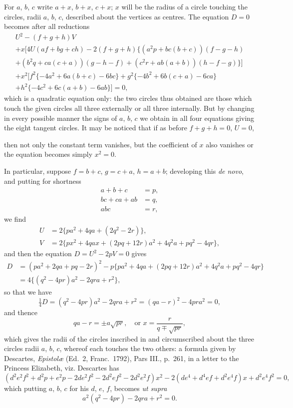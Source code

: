 \documentclass[11pt,a4paper]{article}
\begin{document}
For $a$, $b$, $c$ write $a+x$, $b+x$, $c+x$; $x$ will be the radius of a circle touching the circles, radii $a$, $b$, $c$, described about the vertices as centres. The equation $D = 0$ becomes after all reductions
\begin{multline*}
U^2 - (f+g+h)V\\
+ x[4U(af+bg+ch) - 2(f+g+h)\{(a^2p+bc(b+c))(f-g-h)\\
+ (b^2q+ca(c+a))(g-h-f) + (c^2r+ab(a+b))(h-f-g)\}]\\
+ x^2[f^2\{-4a^2+6a(b+c)-6bc\} + g^2\{-4b^2+6b(c+a)-6ca\}\\
+ h^2\{-4c^2+6c(a+b)-6ab\}] = 0,
\end{multline*}
which is a quadratic equation only: the two circles thus obtained are those which touch the given circles all three externally or all three internally. But by changing in every possible manner the signs of $a$, $b$, $c$ we obtain in all four equations giving the eight tangent circles. It may be noticed that if as before $f+g+h=0$, $U=0$,

\newpage
\setcounter{page}{512}

then not only the constant term vanishes, but the coefficient of $x$ also vanishes or the equation becomes simply $x^2 = 0$.

In particular, suppose $f=b+c$, $g=c+a$, $h=a+b$; developing this \textit{de novo}, and putting for shortness
\begin{align*}
a+b+c &= p,\\
bc+ca+ab &= q,\\
abc &= r,
\end{align*}
we find
\begin{align*}
U &= 2\{pa^2 + 4qa + (2q^2 - 2r)\},\\
V &= 2\{px^2 + 4qax + (2pq + 12r)a^2 + 4q^2a + pq^2 - 4qr\},
\end{align*}
and then the equation $D = U^2 - 2pV = 0$ gives
\begin{align*}
D &= (pa^2 + 2qa + pq - 2r)^2 - p\{pa^2 + 4qa + (2pq+12r)a^2 + 4q^2a + pq^2 - 4qr\}\\
&= 4\{(q^2 - 4pr)a^2 - 2qra + r^2\},
\end{align*}
so that we have
\[
\tfrac{1}{4}D = (q^2 - 4pr)a^2 - 2qra + r^2 = (qa-r)^2 - 4pra^2 = 0,
\]
and thence
\[
qa - r = \pm a\sqrt{pr},\quad \text{or } x = \frac{r}{q \mp \sqrt{pr}},
\]
which gives the radii of the circles inscribed in and circumscribed about the three circles radii $a$, $b$, $c$, whereof each touches the two others: a formula given by Descartes, \textit{Epistol\ae} (Ed.~2, Franc.~1792), Pars III., p.~261, in a letter to the Princess Elizabeth, viz. Descartes has
\[
(d^2e^2f^2 + d^2p + e^2p - 2de^2f^2 - 2d^2ef^2 - 2d^2e^2f)x^2 - 2(de^4 + d^4ef + d^2e^4f)x + d^2e^4f^2 = 0,
\]
which putting $a$, $b$, $c$ for his $d$, $e$, $f$, becomes \textit{ut supra}
\[
a^2(q^2 - 4pr) - 2qra + r^2 = 0.
\]
\end{document}
